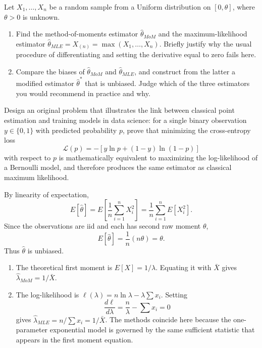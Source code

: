 \begin{problema}\label{prob:23bb182}
Let $X_1,\ldots,X_n$ be a random sample from a Uniform distribution on $[0,\theta]$, where $\theta>0$ is unknown.
\begin{enumerate}[label=(\alph*)]
	\item Find the method-of-moments estimator $\hat\theta_{MoM}$ and the maximum-likelihood estimator $\hat\theta_{MLE}=X_{(n)}=\max(X_1,\ldots,X_n)$. Briefly justify why the usual procedure of differentiating and setting the derivative equal to zero fails here.
	\item Compare the biases of $\hat\theta_{MoM}$ and $\hat\theta_{MLE}$, and construct from the latter a modified estimator $\hat\theta^*$ that is unbiased. Judge which of the three estimators you would recommend in practice and why.
\end{enumerate}
\end{problema}

\begin{problema}\label{prob:0675127}
Design an original problem that illustrates the link between classical point estimation and training models in data science: for a single binary observation $y\in\{0,1\}$ with predicted probability $p$, prove that minimizing the cross-entropy loss
\[
	\mathcal L(p)=-[y\ln p+(1-y)\ln(1-p)]
\]
with respect to $p$ is mathematically equivalent to maximizing the log-likelihood of a Bernoulli model, and therefore produces the same estimator as classical maximum likelihood.
\end{problema}

\begin{solproblema}[prob:1d85679]
By linearity of expectation,
\[
	E[\hat\theta]
	=E\left[\frac1n\sum_{i=1}^n X_i^2\right]
	=\frac1n\sum_{i=1}^n E[X_i^2].
\]
Since the observations are iid and each has second raw moment $\theta$,
\[
	E[\hat\theta]=\frac1n(n\theta)=\theta.
\]
Thus $\hat\theta$ is unbiased.
\end{solproblema}

\begin{solproblema}[prob:6f639cf]
\begin{enumerate}[label=(\alph*)]
	\item The theoretical first moment is $E[X]=1/\lambda$. Equating it with $\bar X$ gives $\hat\lambda_{MoM}=1/\bar X$.
	\item The log-likelihood is $\ell(\lambda)=n\ln\lambda-\lambda\sum x_i$. Setting
	\[
		\frac{d\ell}{d\lambda}=\frac n\lambda-\sum x_i=0
	\]
	gives $\hat\lambda_{MLE}=n/\sum x_i=1/\bar X$. The methods coincide here because the one-parameter exponential model is governed by the same sufficient statistic that appears in the first moment equation.
\end{enumerate}
\end{solproblema}


